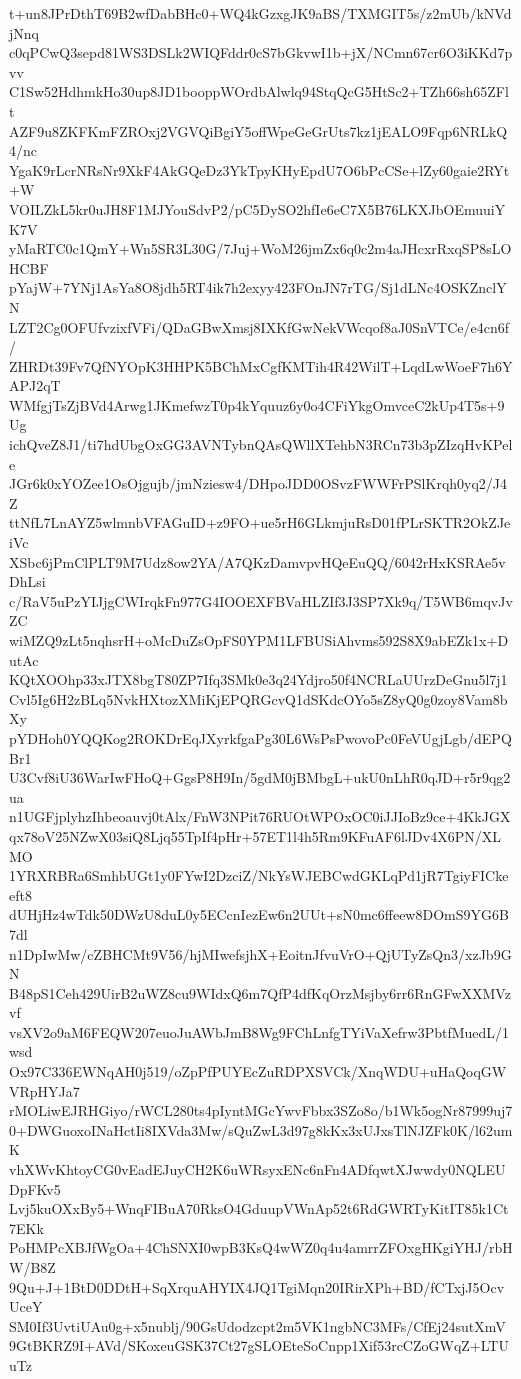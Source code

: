 t+un8JPrDthT69B2wfDabBHc0+WQ4kGzxgJK9aBS/TXMGIT5s/z2mUb/kNVdjNnq
c0qPCwQ3sepd81WS3DSLk2WIQFddr0cS7bGkvwI1b+jX/NCmn67cr6O3iKKd7pvv
C1Sw52HdhmkHo30up8JD1booppWOrdbAlwlq94StqQcG5HtSc2+TZh66sh65ZFlt
AZF9u8ZKFKmFZROxj2VGVQiBgiY5offWpeGeGrUts7kz1jEALO9Fqp6NRLkQ4/nc
YgaK9rLcrNRsNr9XkF4AkGQeDz3YkTpyKHyEpdU7O6bPcCSe+lZy60gaie2RYt+W
VOILZkL5kr0uJH8F1MJYouSdvP2/pC5DySO2hfIe6eC7X5B76LKXJbOEmuuiYK7V
yMaRTC0c1QmY+Wn5SR3L30G/7Juj+WoM26jmZx6q0c2m4aJHcxrRxqSP8sLOHCBF
pYajW+7YNj1AsYa8O8jdh5RT4ik7h2exyy423FOnJN7rTG/Sj1dLNc4OSKZnclYN
LZT2Cg0OFUfvzixfVFi/QDaGBwXmsj8IXKfGwNekVWcqof8aJ0SnVTCe/e4cn6f/
ZHRDt39Fv7QfNYOpK3HHPK5BChMxCgfKMTih4R42WilT+LqdLwWoeF7h6YAPJ2qT
WMfgjTsZjBVd4Arwg1JKmefwzT0p4kYquuz6y0o4CFiYkgOmvceC2kUp4T5s+9Ug
ichQveZ8J1/ti7hdUbgOxGG3AVNTybnQAsQWllXTehbN3RCn73b3pZIzqHvKPele
JGr6k0xYOZee1OsOjgujb/jmNziesw4/DHpoJDD0OSvzFWWFrPSlKrqh0yq2/J4Z
ttNfL7LnAYZ5wlmnbVFAGuID+z9FO+ue5rH6GLkmjuRsD01fPLrSKTR2OkZJeiVc
XSbc6jPmClPLT9M7Udz8ow2YA/A7QKzDamvpvHQeEuQQ/6042rHxKSRAe5vDhLsi
c/RaV5uPzYIJjgCWIrqkFn977G4IOOEXFBVaHLZIf3J3SP7Xk9q/T5WB6mqvJvZC
wiMZQ9zLt5nqhsrH+oMcDuZsOpFS0YPM1LFBUSiAhvms592S8X9abEZk1x+DutAc
KQtXOOhp33xJTX8bgT80ZP7Ifq3SMk0e3q24Ydjro50f4NCRLaUUrzDeGnu5l7j1
Cvl5Ig6H2zBLq5NvkHXtozXMiKjEPQRGcvQ1dSKdcOYo5sZ8yQ0g0zoy8Vam8bXy
pYDHoh0YQQKog2ROKDrEqJXyrkfgaPg30L6WsPsPwovoPc0FeVUgjLgb/dEPQBr1
U3Cvf8iU36WarIwFHoQ+GgsP8H9In/5gdM0jBMbgL+ukU0nLhR0qJD+r5r9qg2ua
n1UGFjplyhzIhbeoauvj0tAlx/FnW3NPit76RUOtWPOxOC0iJJIoBz9ce+4KkJGX
qx78oV25NZwX03siQ8Ljq55TpIf4pHr+57ET1l4h5Rm9KFuAF6lJDv4X6PN/XLMO
1YRXRBRa6SmhbUGt1y0FYwI2DzciZ/NkYsWJEBCwdGKLqPd1jR7TgiyFICkeeft8
dUHjHz4wTdk50DWzU8duL0y5ECcnIezEw6n2UUt+sN0mc6ffeew8DOmS9YG6B7dl
n1DpIwMw/cZBHCMt9V56/hjMIwefsjhX+EoitnJfvuVrO+QjUTyZsQn3/xzJb9GN
B48pS1Ceh429UirB2uWZ8cu9WIdxQ6m7QfP4dfKqOrzMsjby6rr6RnGFwXXMVzvf
vsXV2o9aM6FEQW207euoJuAWbJmB8Wg9FChLnfgTYiVaXefrw3PbtfMuedL/1wsd
Ox97C336EWNqAH0j519/oZpPfPUYEcZuRDPXSVCk/XnqWDU+uHaQoqGWVRpHYJa7
rMOLiwEJRHGiyo/rWCL280ts4pIyntMGcYwvFbbx3SZo8o/b1Wk5ogNr87999uj7
0+DWGuoxoINaHctIi8IXVda3Mw/sQuZwL3d97g8kKx3xUJxsTlNJZFk0K/l62umK
vhXWvKhtoyCG0vEadEJuyCH2K6uWRsyxENc6nFn4ADfqwtXJwwdy0NQLEUDpFKv5
Lvj5kuOXxBy5+WnqFIBuA70RksO4GduupVWnAp52t6RdGWRTyKitIT85k1Ct7EKk
PoHMPcXBJfWgOa+4ChSNXI0wpB3KsQ4wWZ0q4u4amrrZFOxgHKgiYHJ/rbHW/B8Z
9Qu+J+1BtD0DDtH+SqXrquAHYIX4JQ1TgiMqn20IRirXPh+BD/fCTxjJ5OcvUceY
SM0If3UvtiUAu0g+x5nublj/90GsUdodzcpt2m5VK1ngbNC3MFs/CfEj24sutXmV
9GtBKRZ9I+AVd/SKoxeuGSK37Ct27gSLOEteSoCnpp1Xif53rcCZoGWqZ+LTUuTz
